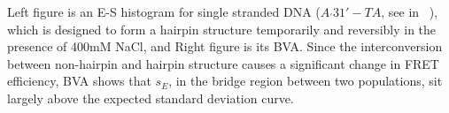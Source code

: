 Left figure is an E-S histogram for single stranded DNA ($A_'31'-TA$, see in ~\cite{Tsukanov_2013}), which is designed to form a hairpin structure temporarily and reversibly in the presence of 400mM NaCl, and Right figure is its BVA. Since the interconversion between non-hairpin and hairpin structure causes a significant change in FRET efficiency, BVA shows that $s_E$, in the bridge region between two populations, sit largely above the expected standard deviation curve.